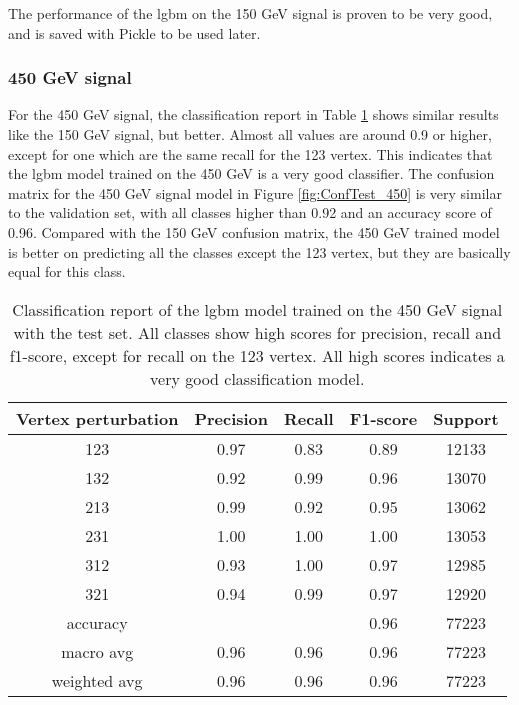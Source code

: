 \documentclass[a4paper, american, 12pt]{report}
\begin{document}
	The performance of the \acrshort{lgbm} on the 150 GeV signal is proven to be very good, and is saved with Pickle to be used later.
	

	\subsubsection{450 GeV signal}
	\label{subsect:Result-Test450}
	For the 450 GeV signal, the classification report in Table \ref{tab:ClassReport_450} shows similar results like the 150 GeV signal, but better. Almost all values are around 0.9 or higher, except for one which are the same recall for the 123 vertex. This indicates that the \acrshort{lgbm} model trained on the 450 GeV is a very good classifier. The confusion matrix for the 450 GeV signal model in Figure \ref{fig:ConfTest_450} is very similar to the validation set, with all classes higher than 0.92 and an accuracy score of 0.96. Compared with the 150 GeV confusion matrix, the 450 GeV trained model is better on predicting all the classes except the 123 vertex, but they are basically equal for this class.
	\begin{table}[ht!]
		\centering
		\begin{tabular}{ |c|c|c|c|c| }
			\hline \rule{0pt}{13pt}
			Vertex perturbation & Precision & Recall & F1-score & Support \\
			\hline \rule{0pt}{13pt}
			123 & 0.97 & 0.83 & 0.89 & 12133 \\
			\hline \rule{0pt}{13pt}
			132 & 0.92 & 0.99 & 0.96 & 13070 \\
			\hline \rule{0pt}{13pt}
			213 & 0.99 & 0.92 & 0.95 & 13062 \\
			\hline \rule{0pt}{13pt}
			231 & 1.00 & 1.00 & 1.00 & 13053  \\
			\hline \rule{0pt}{13pt}
			312 & 0.93 & 1.00 &  0.97 & 12985 \\
			\hline \rule{0pt}{13pt}
			321 & 0.94 & 0.99 & 0.97 & 12920 \\
			\hline \rule{0pt}{13pt}
			accuracy &   &   &  0.96 & 77223 \\
			\hline \rule{0pt}{13pt}
			macro avg & 0.96  & 0.96 & 0.96 & 77223 \\
			\hline \rule{0pt}{13pt}
			weighted avg & 0.96 & 0.96 & 0.96 & 77223 \\
			\hline
		\end{tabular}	         
		\caption[Classification report of the \acrshort{lgbm} model trained on the 450 GeV signal.]{Classification report of the \acrshort{lgbm} model trained on the 450 GeV signal with the test set. All classes show high scores for precision, recall and f1-score, except for recall on the 123 vertex. All high scores indicates a very good classification model.}
		\label{tab:ClassReport_450}
	\end{table}
\end{document}

